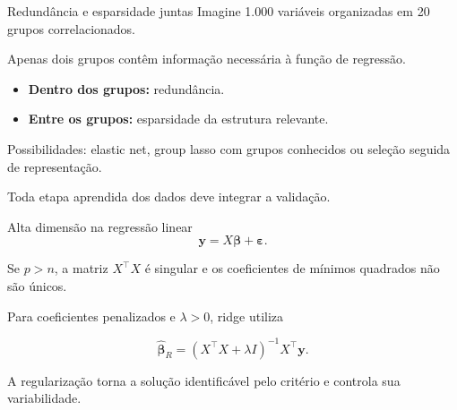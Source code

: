 \documentclass[
  10pt,
  ignorenonframetext,
  aspectratio=169,
  brazilian,
]{beamer}
\providecommand{\tightlist}{%
  \setlength{\itemsep}{0pt}\setlength{\parskip}{0pt}}
\begin{document}
\begin{frame}{Redundância e esparsidade juntas}
\protect{}\label{redunduxe2ncia-e-esparsidade-juntas}
Imagine 1.000 variáveis organizadas em 20 grupos correlacionados.

Apenas dois grupos contêm informação necessária à função de regressão.

\begin{itemize}
\tightlist
\item
  \textbf{Dentro dos grupos:} redundância.
\item
  \textbf{Entre os grupos:} esparsidade da estrutura relevante.
\end{itemize}

Possibilidades: elastic net, group lasso com grupos conhecidos ou
seleção seguida de representação.

Toda etapa aprendida dos dados deve integrar a validação.
\end{frame}

\begin{frame}{Alta dimensão na regressão linear}
\protect{}\label{alta-dimensuxe3o-na-regressuxe3o-linear}
\[
\mathbf y=X\boldsymbol\beta+\boldsymbol\varepsilon.
\]

Se \(p>n\), a matriz \(X^\top X\) é singular e os coeficientes de
mínimos quadrados não são únicos.

Para coeficientes penalizados e \(\lambda>0\), ridge utiliza

\[
\hat{\boldsymbol\beta}_{R}
=(X^\top X+\lambda I)^{-1}X^\top\mathbf y.
\]

A regularização torna a solução identificável pelo critério e controla
sua variabilidade.

\end{frame}
\end{document}
